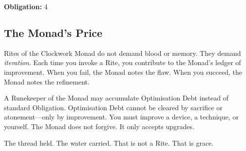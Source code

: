 \textbf{Obligation:} 4

\subsection{The Monad's Price}

Rites of the Clockwork Monad do not demand blood or memory. They demand \textit{iteration}. Each time you invoke a Rite, you contribute to the Monad's ledger of improvement. When you fail, the Monad notes the flaw. When you succeed, the Monad notes the refinement.

A Runekeeper of the Monad may accumulate Optimisation Debt instead of standard Obligation. Optimisation Debt cannot be cleared by sacrifice or atonement—only by improvement. You must improve a device, a technique, or yourself. The Monad does not forgive. It only accepts upgrades.

The thread held. The water carried. That is not a Rite. That is grace.

